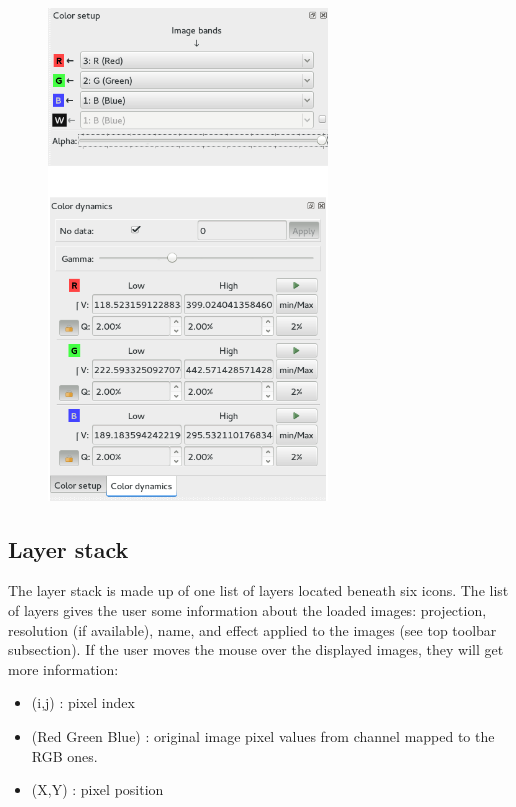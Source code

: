 \begin{figure}[!h] 
  \center
  \includegraphics[width=0.66\textwidth]{../Art/MonteverdiImages/colsetdyn.png}
  \label{fig:colorsetdyn}
\end{figure}


\subsection{Layer stack}

The layer stack is made up of one list of layers located beneath six icons.
The list of layers gives the user some information about the loaded images:
projection, resolution (if available), name, and effect applied to the images (see top toolbar subsection).
If the user moves the mouse over the displayed images, they will get more information:

\begin{itemize}
\item (i,j) : pixel index
\item (Red Green Blue) : original image pixel values from channel mapped to the RGB ones.
\item (X,Y) : pixel position
\end{itemize}

